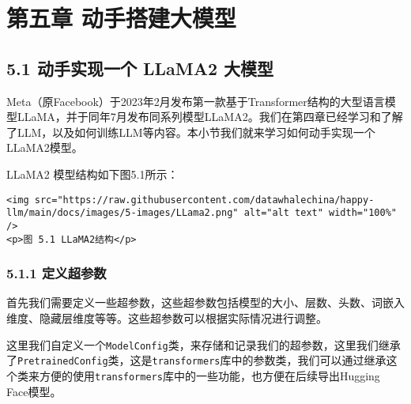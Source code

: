 \documentclass[
]{article}
\author{}
\date{}
\begin{document}
{
\setcounter{tocdepth}{3}
\tableofcontents
}
\section{第五章
动手搭建大模型}\label{ux7b2cux4e94ux7ae0-ux52a8ux624bux642dux5efaux5927ux6a21ux578b}

\subsection{5.1 动手实现一个 LLaMA2
大模型}\label{ux52a8ux624bux5b9eux73b0ux4e00ux4e2a-llama2-ux5927ux6a21ux578b}

Meta（原Facebook）于2023年2月发布第一款基于Transformer结构的大型语言模型LLaMA，并于同年7月发布同系列模型LLaMA2。我们在第四章已经学习和了解了LLM，以及如何训练LLM等内容。本小节我们就来学习如何动手实现一个LLaMA2模型。

LLaMA2 模型结构如下图5.1所示：

\begin{verbatim}
<img src="https://raw.githubusercontent.com/datawhalechina/happy-llm/main/docs/images/5-images/LLama2.png" alt="alt text" width="100%" />
<p>图 5.1 LLaMA2结构</p>
\end{verbatim}

\subsubsection{5.1.1 定义超参数}\label{ux5b9aux4e49ux8d85ux53c2ux6570}

首先我们需要定义一些超参数，这些超参数包括模型的大小、层数、头数、词嵌入维度、隐藏层维度等等。这些超参数可以根据实际情况进行调整。

这里我们自定义一个\texttt{ModelConfig}类，来存储和记录我们的超参数，这里我们继承了\texttt{PretrainedConfig}类，这是\texttt{transformers}库中的参数类，我们可以通过继承这个类来方便的使用\texttt{transformers}库中的一些功能，也方便在后续导出Hugging
Face模型。
\end{document}
